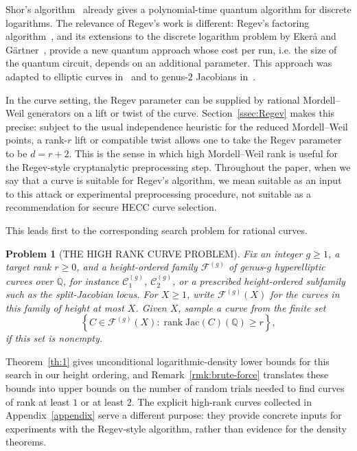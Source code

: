 \documentclass{amsart}
\newcommand{\Jac}{\mathrm{Jac}}
\newtheorem{problem}{Problem}
\begin{document}
Shor's algorithm~\cite{Shor1994} already gives a polynomial-time quantum
algorithm for discrete logarithms. The relevance of Regev's work is different:
Regev's factoring algorithm~\cite{Regev2023}, and its extensions to the discrete
logarithm problem by Eker{\aa} and G\"artner~\cite{Ekera2024}, provide a new
quantum approach whose cost per run, i.e. the size of the quantum circuit, depends on an additional parameter. This approach was
adapted to elliptic curves in~\cite{BarbulescuBarcauPasol2025} and to genus-$2$
Jacobians in~\cite{BarbulescuBisson2024}.

In the curve setting, the Regev parameter can be supplied by rational
Mordell--Weil generators on a lift or twist of the curve. Section~\ref{ssec:Regev}
makes this precise: subject to the usual independence heuristic for the reduced
Mordell--Weil points, a rank-\(r\) lift or compatible twist allows one to take
the Regev parameter to be \(d=r+2\). This is the sense in which high
Mordell--Weil rank is useful for the Regev-style cryptanalytic preprocessing
step. Throughout the paper, when we say that a curve is suitable for Regev's
algorithm, we mean suitable as an input to this attack or experimental
preprocessing procedure, not suitable as a recommendation for secure HECC curve
selection.

This leads first to the corresponding search problem for rational curves.
\begin{problem}[THE HIGH RANK CURVE PROBLEM]\label{prob:draw}
Fix an integer \(g\ge 1\), a target rank \(r\ge 0\), and a height-ordered family
\(\mathcal F^{(g)}\) of genus-\(g\) hyperelliptic curves over \(\mathbb Q\), for
instance \(\mathcal C^{(g)}_1\), \(\mathcal C^{(g)}_2\), or a prescribed
height-ordered subfamily such as the split-Jacobian locus. For \(X\ge 1\), write
\(\mathcal F^{(g)}(X)\) for the curves in this family of height at most \(X\).
Given \(X\), sample a curve from the finite set
\[
\left\{
C\in \mathcal F^{(g)}(X) :
\operatorname{rank}\Jac(C)(\mathbb Q)\ge r
\right\},
\]
if this set is nonempty.
\end{problem}

Theorem~\ref{th:1} gives unconditional logarithmic-density lower bounds for this
search in our height ordering, and Remark~\ref{rmk:brute-force} translates these
bounds into upper bounds on the number of random trials needed to find curves of
rank at least \(1\) or at least \(2\). The explicit high-rank curves collected in
Appendix~\ref{appendix} serve a different purpose: they provide concrete inputs
for experiments with the Regev-style algorithm, rather than evidence for the
density theorems.
\end{document}
